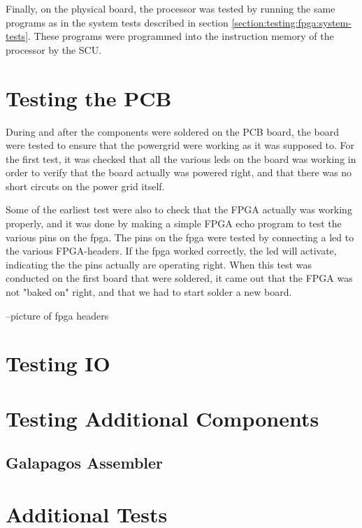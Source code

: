 Finally, on the physical board, the processor was tested by running the same programs as in the system tests described in section \vref{section:testing:fpga:system-tests}.
These programs were programmed into the instruction memory of the processor by the SCU.

\section{Testing the PCB}
During and after the components were soldered on the PCB board, the board were tested to ensure that the powergrid were working as it was supposed to.
For the first test, it was checked that all the various leds on the board was working in order to verify that the board actually was powered right, and that there was
no short circuts on the power grid itself.

Some of the earliest test were also to check that the FPGA actually was working properly, and it was done by making a simple FPGA echo program to test the various pins on the fpga.
The pins on the fpga were tested by connecting a led to the various FPGA-headers. If the fpga worked correctly, the led will activate, indicating the the pins actually are operating right.
When this test was conducted on the first board that were soldered, it came out that the FPGA was not "baked on" right, and that we had to start solder a new board. 

--picture of fpga headers

\section{Testing IO}


\section{Testing Additional Components}

\subsection{Galapagos Assembler}


\section{Additional Tests}

